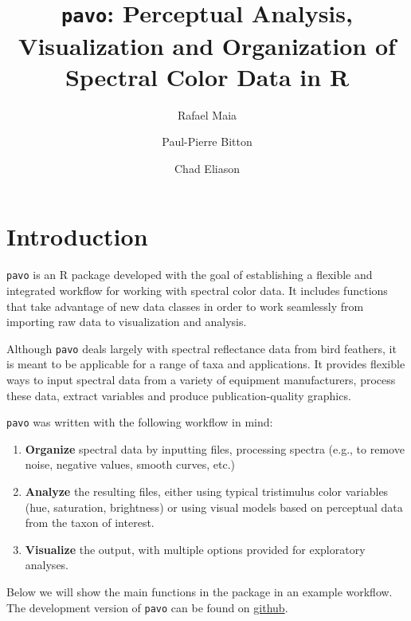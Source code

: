 \documentclass{article}
\newcommand{\pavo}{{\tt pavo}}  %
\begin{document}



\title{\pavo{}: {\bf P}erceptual {\bf A}nalysis, {\bf V}isualization and {\bf O}rganization of Spectral Color Data in R}
\author[1]{Rafael Maia}
\author[2]{Paul-Pierre Bitton}
\author[1]{Chad Eliason}
\maketitle

\addtolength{\parskip}{-.08in}
\tableofcontents
\addtolength{\parskip}{.08in}

\section*{Introduction}

\pavo{} is an R package developed with the goal of establishing a flexible and integrated 
workflow for working with spectral color data. It includes functions that take advantage of
new data classes in order to work seamlessly from importing raw data to visualization and 
analysis.

Although \pavo{} deals largely with spectral reflectance data from bird feathers, it is meant 
to be applicable for a range of taxa and applications. It provides flexible ways to input
spectral data from a variety of equipment manufacturers, process these data, extract variables 
and produce publication-quality graphics.

\pavo{} was written with the following workflow in mind:

\begin{enumerate}
\item {\bf Organize} spectral data by inputting files, processing spectra (e.g., to remove
noise, negative values, smooth curves, etc.)
\item {\bf Analyze} the resulting files, either using typical tristimulus color variables (hue,
saturation, brightness) or using visual models based on perceptual data from the taxon of 
interest.
\item {\bf Visualize} the output, with multiple options provided for exploratory analyses.
\end{enumerate}

Below we will show the main functions in the package in an example workflow. The development
version of \pavo{} can be found on \href{https://github.com/rmaia/pavo}{github}.
\end{document}
